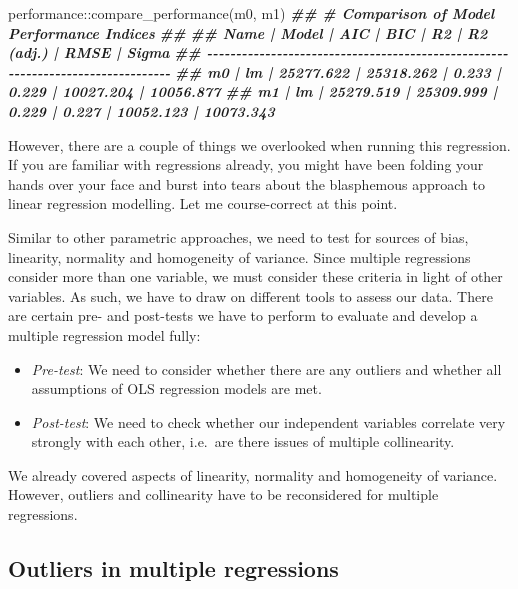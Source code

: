 \documentclass[
]{book}
\newenvironment{Shaded}{\begin{snugshade}}{\end{snugshade}}
\newcommand{\DocumentationTok}[1]{\textcolor[rgb]{0.56,0.35,0.01}{\textbf{\textit{#1}}}}
\newcommand{\FunctionTok}[1]{\textcolor[rgb]{0.00,0.00,0.00}{#1}}
\newcommand{\NormalTok}[1]{#1}
\newcommand{\SpecialCharTok}[1]{\textcolor[rgb]{0.00,0.00,0.00}{#1}}
\begin{document}
\begin{Shaded}
\begin{Highlighting}[]
\NormalTok{performance}\SpecialCharTok{::}\FunctionTok{compare\_performance}\NormalTok{(m0, m1)}
\DocumentationTok{\#\# \# Comparison of Model Performance Indices}
\DocumentationTok{\#\# }
\DocumentationTok{\#\# Name | Model |       AIC |       BIC |    R2 | R2 (adj.) |      RMSE |     Sigma}
\DocumentationTok{\#\# {-}{-}{-}{-}{-}{-}{-}{-}{-}{-}{-}{-}{-}{-}{-}{-}{-}{-}{-}{-}{-}{-}{-}{-}{-}{-}{-}{-}{-}{-}{-}{-}{-}{-}{-}{-}{-}{-}{-}{-}{-}{-}{-}{-}{-}{-}{-}{-}{-}{-}{-}{-}{-}{-}{-}{-}{-}{-}{-}{-}{-}{-}{-}{-}{-}{-}{-}{-}{-}{-}{-}{-}{-}{-}{-}{-}{-}{-}{-}{-}}
\DocumentationTok{\#\# m0   |    lm | 25277.622 | 25318.262 | 0.233 |     0.229 | 10027.204 | 10056.877}
\DocumentationTok{\#\# m1   |    lm | 25279.519 | 25309.999 | 0.229 |     0.227 | 10052.123 | 10073.343}
\end{Highlighting}
\end{Shaded}

However, there are a couple of things we overlooked when running this regression. If you are familiar with regressions already, you might have been folding your hands over your face and burst into tears about the blasphemous approach to linear regression modelling. Let me course-correct at this point.

Similar to other parametric approaches, we need to test for sources of bias, linearity, normality and homogeneity of variance. Since multiple regressions consider more than one variable, we must consider these criteria in light of other variables. As such, we have to draw on different tools to assess our data. There are certain pre- and post-tests we have to perform to evaluate and develop a multiple regression model fully:

\begin{itemize}
\item
  \emph{Pre-test}: We need to consider whether there are any outliers and whether all assumptions of OLS regression models are met.
\item
  \emph{Post-test}: We need to check whether our independent variables correlate very strongly with each other, i.e.~are there issues of multiple collinearity.
\end{itemize}

We already covered aspects of linearity, normality and homogeneity of variance. However, outliers and collinearity have to be reconsidered for multiple regressions.

\hypertarget{outliers-in-multiple-regressions}{%
\subsection{Outliers in multiple regressions}\label{outliers-in-multiple-regressions}}
\end{document}
